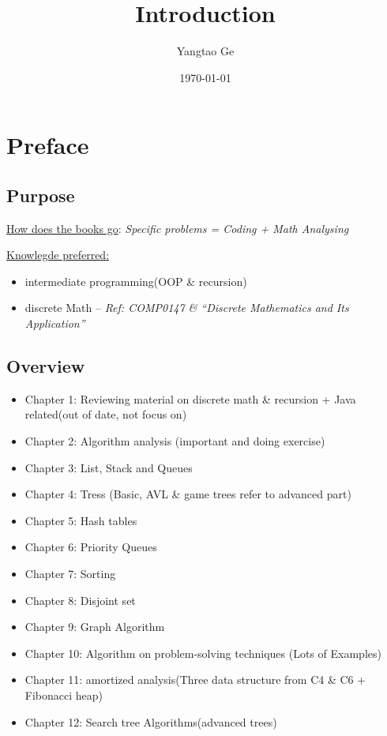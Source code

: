 \documentclass[12pt]{article}
\title{Introduction}
\author{Yangtao Ge}
\date{\today}
\theoremstyle{definition}
\begin{document}
\maketitle

\section{Preface}
\subsection{Purpose}
\underline{How does the books go}: \newline
\textit{Specific problems = Coding + Math Analysing}

\underline{Knowlegde preferred:}
\begin{itemize}
    \item intermediate programming(OOP \& recursion)
    \item discrete Math -- \emph{Ref: COMP0147 \& ``Discrete Mathematics and Its Application''}
\end{itemize}

\subsection{Overview}
\begin{itemize}
    \item Chapter 1: Reviewing material on discrete math \& recursion + Java related(out of date, not focus on)
    \item Chapter 2: Algorithm analysis (important and doing exercise)
    \item Chapter 3: List, Stack and Queues
    \item Chapter 4: Tress (Basic, AVL \& game trees refer to advanced part)
    \item Chapter 5: Hash tables 
    \item Chapter 6: Priority Queues
    \item Chapter 7: Sorting
    \item Chapter 8: Disjoint set
    \item Chapter 9: Graph Algorithm
\end{itemize}

\begin{itemize}
    \item Chapter 10: Algorithm on problem-solving techniques (Lots of Examples)
    \item Chapter 11: amortized analysis(Three data structure from C4 \& C6 + Fibonacci heap)
    \item Chapter 12: Search tree Algorithms(advanced trees)
\end{itemize}
\end{document}
